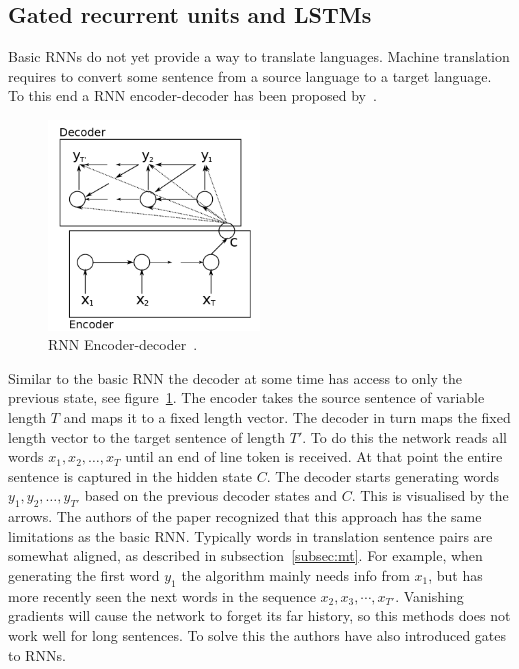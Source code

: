 \subsection{Gated recurrent units and LSTMs}
\label{subsec:gru}
Basic RNNs do not yet provide a way to translate languages.
Machine translation requires to convert some sentence from a source language to a target language.
To this end a RNN encoder-decoder has been proposed by~\citet{cho2014learning}.

\begin{figure}[htbp]
    \begin{center}
        \includegraphics[width=0.5\textwidth]{figures/encoder_decoder.png}
    \end{center}
    \caption{RNN Encoder-decoder~\cite[Figure 1]{cho2014learning}.}
    \label{fig:encoder_decoder}
\end{figure}

Similar to the basic RNN the decoder at some time has access to only the previous state, see figure~\ref{fig:encoder_decoder}.
The encoder takes the source sentence of variable length $T$ and maps it to a fixed length vector.
The decoder in turn maps the fixed length vector to the target sentence of length $T'$.
To do this the network reads all words $x_1, x_2, \ldots, x_T$ until an end of line token is received.
At that point the entire sentence is captured in the hidden state $C$.
The decoder starts generating words $y_1, y_2, \ldots, y_{T'}$ based on the previous decoder states and $C$.
This is visualised by the arrows.
The authors of the paper recognized that this approach has the same limitations as the basic RNN.
Typically words in translation sentence pairs are somewhat aligned, as described in subsection~\ref{subsec:mt}.
For example, when generating the first word $y_1$ the algorithm mainly needs info from $x_1$, but has more recently seen the next words in the sequence $x_2, x_3, \cdots, x_{T'}$.
Vanishing gradients will cause the network to forget its far history, so this methods does not work well for long sentences.
To solve this the authors have also introduced gates to RNNs.

